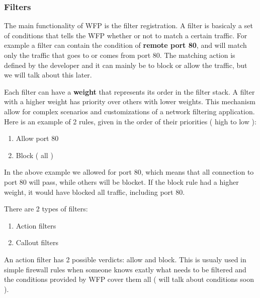 \subsubsection{Filters}

The main functionality of WFP is the filter registration. A filter is basicaly a set of conditions that tells the WFP whether or not to match a certain traffic. For example a filter can contain the condition of \textbf{remote port 80}, and will match only the traffic that goes to or comes from port 80. The matching action is defined by the developer and it can mainly be to block or allow the traffic, but we will talk about this later.

\vspace{5mm}

Each filter can have a \textbf{weight} that represents its order in the filter stack. A filter with a higher weight has priority over others with lower weights. This mechanism allow for complex scenarios and customizations of a network filtering application.
Here is an example of 2 rules, given in the order of their priorities ( high to low ):
\begin{enumerate}
\item Allow port 80
\item Block ( all )
\end{enumerate}

\vspace{5mm}

In the above example we allowed for port 80, which means that all connection to port 80 will pass, while others will be blocket. If the block rule had a higher weight, it would have blocked all traffic, including port 80.

\vspace{5mm}

There are 2 types of filters:
\begin{enumerate}
\item Action filters
\item Callout filters
\end{enumerate}

\vspace{5mm}

An action filter has 2 possible verdicts: allow and block. This is usualy used in simple firewall rules when someone knows exatly what needs to be filtered and the conditions provided by WFP cover them all ( will talk about conditions soon ).
\vspace{5mm}

